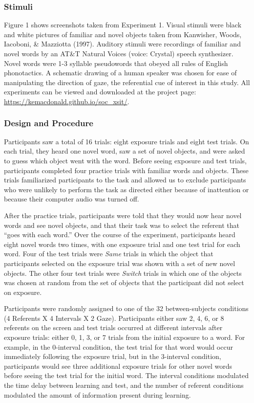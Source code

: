 \documentclass[authoryear, review]{elsarticle}
\begin{document}
\subsubsection{Stimuli}\label{stimuli}

Figure 1 shows screenshots taken from Experiment 1. Visual stimuli were
black and white pictures of familiar and novel objects taken from
Kanwisher, Woods, Iacoboni, \& Mazziotta (1997). Auditory stimuli were
recordings of familiar and novel words by an AT\&T Natural Voices
\texttrademark (voice: Crystal) speech synthesizer. Novel words were 1-3
syllable pseudowords that obeyed all rules of English phonotactics. A
schematic drawing of a human speaker was chosen for ease of manipulating
the direction of gaze, the referential cue of interest in this study.
All experiments can be viewed and downloaded at the project page:
\url{https://kemacdonald.github.io/soc_xsit/}.

\subsubsection{Design and Procedure}\label{design-and-procedure}

Participants saw a total of 16 trials: eight exposure trials and eight
test trials. On each trial, they heard one novel word, saw a set of
novel objects, and were asked to guess which object went with the word.
Before seeing exposure and test trials, participants completed four
practice trials with familiar words and objects. These trials
familiarized participants to the task and allowed us to exclude
participants who were unlikely to perform the task as directed either
because of inattention or because their computer audio was turned off.

After the practice trials, participants were told that they would now
hear novel words and see novel objects, and that their task was to
select the referent that ``goes with each word.'' Over the course of the
experiment, participants heard eight novel words two times, with one
exposure trial and one test trial for each word. Four of the test trials
were \emph{Same} trials in which the object that participants selected
on the exposure trial was shown with a set of new novel objects. The
other four test trials were \emph{Switch} trials in which one of the
objects was chosen at random from the set of objects that the
participant did not select on exposure.

Participants were randomly assigned to one of the 32 between-subjects
conditions (4 Referents X 4 Intervals X 2 Gaze). Participants either saw
2, 4, 6, or 8 referents on the screen and test trials occurred at
different intervals after exposure trials: either 0, 1, 3, or 7 trials
from the initial exposure to a word. For example, in the 0-interval
condition, the test trial for that word would occur immediately
following the exposure trial, but in the 3-interval condition,
participants would see three additional exposure trials for other novel
words before seeing the test trial for the initial word. The interval
conditions modulated the time delay between learning and test, and the
number of referent conditions modulated the amount of information
present during learning.
\end{document}
